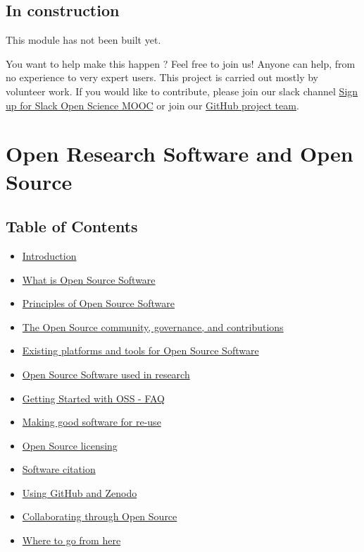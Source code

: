 \documentclass[]{book}
\providecommand{\tightlist}{%
  \setlength{\itemsep}{0pt}\setlength{\parskip}{0pt}}
\begin{document}
{{{{{{{\hypertarget{in-construction-2}{%
\section{In construction}\label{in-construction-2}}

This module has not been built yet.

You want to help make this happen ? Feel free to join us! Anyone can help, from no experience to very expert users. This project is carried out mostly by volunteer work. If you would like to contribute, please join our slack channel \href{https://osmooc.herokuapp.com/}{Sign up for Slack Open Science MOOC} or join our \href{https://open-science-mooc-invite.herokuapp.com/}{GitHub project team}.

\hypertarget{open-research-software-and-open-source}{%
\chapter{Open Research Software and Open Source}\label{open-research-software-and-open-source}}

\hypertarget{table-of-contents-1}{%
\section*{Table of Contents}\label{table-of-contents-1}}

\begin{itemize}
\tightlist
\item
  \protect\hyperlink{Introduction}{Introduction}
\item
  \protect\hyperlink{What_OSS}{What is Open Source Software}
\item
  \protect\hyperlink{Principles}{Principles of Open Source Software}
\item
  \protect\hyperlink{OS_Community}{The Open Source community, governance, and contributions}
\item
  \protect\hyperlink{Platforms}{Existing platforms and tools for Open Source Software}
\item
  \protect\hyperlink{Research}{Open Source Software used in research}
\item
  \protect\hyperlink{FAQ}{Getting Started with OSS - FAQ}
\item
  \protect\hyperlink{Reuse}{Making good software for re-use}
\item
  \protect\hyperlink{Licensing}{Open Source licensing}
\item
  \protect\hyperlink{Citation}{Software citation}
\item
  \protect\hyperlink{GitHub_Zenodo}{Using GitHub and Zenodo}
\item
  \protect\hyperlink{Collaborating}{Collaborating through Open Source}
\item
  \protect\hyperlink{Future_OSS}{Where to go from here}
\end{itemize}

}}}}}}}
\end{document}
